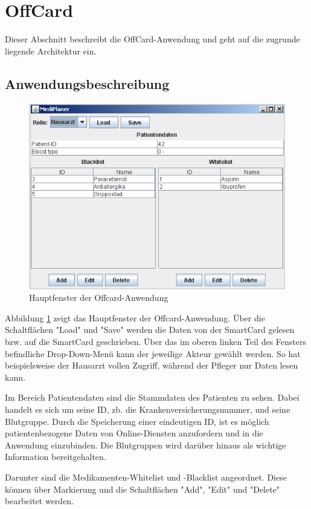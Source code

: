 \documentclass[parskip]{scrartcl}
\begin{document}
	\section{OffCard}
		Dieser Abschnitt beschreibt die OffCard-Anwendung und geht auf die zugrunde liegende Architektur ein.
	
	\subsection{Anwendungsbeschreibung}
		\begin{figure}[H]
			\centering
			\includegraphics[width=.75\linewidth]{./maingui.png}
			\caption{Hauptfenster der Offcard-Anwendung}
			\label{fig:maingui}
		\end{figure}
		
		Abbildung \ref{fig:maingui} zeigt das Hauptfenster der Offcard-Anwendung. Über die Schaltflächen "Load" und "Save" werden die Daten von der SmartCard gelesen bzw. auf die SmartCard geschrieben. Über das im oberen linken Teil des Fensters befindliche Drop-Down-Menü kann der jeweilige Akteur gewählt werden. So hat beispielsweise der Hausarzt vollen Zugriff, während der Pfleger nur Daten lesen kann.
		
		Im Bereich Patientendaten sind die Stammdaten des Patienten zu sehen. Dabei handelt es sich um seine ID, zb. die Krankenversicherungsnummer, und seine Blutgruppe. Durch die Speicherung einer eindeutigen ID, ist es möglich patientenbezogene Daten von Online-Diensten anzufordern und in die Anwendung einzubinden. Die Blutgruppen wird darüber hinaus als wichtige Information bereitgehalten.
		
		Darunter sind die Medikamenten-Whitelist und -Blacklist angeordnet. Diese können über Markierung und die Schaltflächen "Add", "Edit" und "Delete" bearbeitet werden.
		
\end{document}
